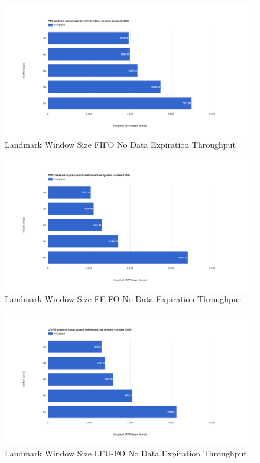 \begin{figure}[!htbp]
    \centering
    \includegraphics[width=\textwidth]{img/app3-land-ws-fifo-no-t.png}
    \caption{Landmark Window Size FIFO No Data Expiration Throughput}
\end{figure}
\begin{figure}[!htbp]
    \centering
    \includegraphics[width=\textwidth]{img/app3-land-ws-fefo-no-t.png}
    \caption{Landmark Window Size FE-FO No Data Expiration Throughput}
\end{figure}
\begin{figure}[!htbp]
    \centering
    \includegraphics[width=\textwidth]{img/app3-land-ws-lfufo-no-t.png}
    \caption{Landmark Window Size LFU-FO No Data Expiration Throughput}
\end{figure}
